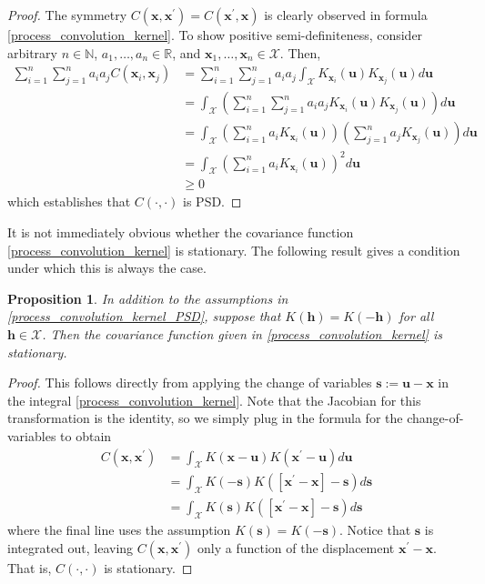 \documentclass[12pt]{article}
\newcommand{\R}{\mathbb{R}}
\newcommand{\Ker}{K}
\newcommand{\covFun}{C}
\newcommand{\locSpace}{\mathcal{X}}
\newcommand{\loc}{\mathbf{x}}
\newcommand{\locTwo}{\loc^\prime}
\newcommand{\locDum}{\mathbf{u}}
\newcommand{\locLag}{\mathbf{h}}
\newcommand{\locLagDum}{\mathbf{s}}
\newtheorem{prop}{Proposition}
\begin{document}
\begin{proof} 
The symmetry $\covFun(\loc, \locTwo) = \covFun(\locTwo, \loc)$ is clearly observed in formula \ref{process_convolution_kernel}. To show positive semi-definiteness, consider arbitrary 
$n \in \mathbb{N}$, $a_1, \dots, a_n \in \R$, and $\loc_1, \dots, \loc_n \in \locSpace$. Then, 
\begin{align*}
\sum_{i = 1}^{n} \sum_{j = 1}^{n} a_i a_j \covFun(\loc_i, \loc_j) 
&= \sum_{i = 1}^{n} \sum_{j = 1}^{n} a_i a_j \int_{\locSpace} \Ker_{\loc_i}(\locDum) \Ker_{\loc_j}(\locDum) d\locDum \\
&= \int_{\locSpace} \left(\sum_{i = 1}^{n} \sum_{j = 1}^{n} a_i a_j  \Ker_{\loc_i}(\locDum) \Ker_{\loc_j}(\locDum)\right) d\locDum \\
&=  \int_{\locSpace} \left(\sum_{i = 1}^{n} a_i \Ker_{\loc_i}(\locDum)\right)  \left(\sum_{j = 1}^{n} a_j \Ker_{\loc_j}(\locDum)\right) d\locDum \\
&=  \int_{\locSpace} \left(\sum_{i = 1}^{n} a_i \Ker_{\loc_i}(\locDum)\right)^2 d\locDum \\
&\geq 0
\end{align*}
which establishes that $\covFun(\cdot, \cdot)$ is PSD. 
\end{proof} 

It is not immediately obvious whether the covariance function \ref{process_convolution_kernel} is stationary. The following result gives a condition under which this is always the case. 

\begin{prop} 
In addition to the assumptions in \ref{process_convolution_kernel_PSD}, suppose that $\Ker(\locLag) = \Ker(-\locLag)$ for all $\locLag \in \locSpace$. 
Then the covariance function given in \ref{process_convolution_kernel} is stationary. 
\end{prop}

\begin{proof} 
This follows directly from applying the change of variables $\locLagDum := \locDum - \loc$ in the integral \ref{process_convolution_kernel}. Note that the Jacobian for this 
transformation is the identity, so we simply plug in the formula for the change-of-variables to obtain
\begin{align*}
\covFun(\loc, \locTwo) &= \int_{\locSpace} \Ker(\loc - \locDum)\Ker(\locTwo - \locDum) d\locDum \\ 
				  &=   \int_{\locSpace} \Ker(-\locLagDum)\Ker([\locTwo - \loc] - \locLagDum) d\locLagDum \\
				  &= \int_{\locSpace} \Ker(\locLagDum)\Ker([\locTwo - \loc] - \locLagDum) d\locLagDum
\end{align*}
where the final line uses the assumption $\Ker(\locLagDum) = \Ker(-\locLagDum)$. Notice that $\locLagDum$ is integrated out, leaving $\covFun(\loc, \locTwo)$ only a 
function of the displacement $\locTwo - \loc$. That is, $\covFun(\cdot, \cdot)$ is stationary. 
\end{proof}
\end{document}
